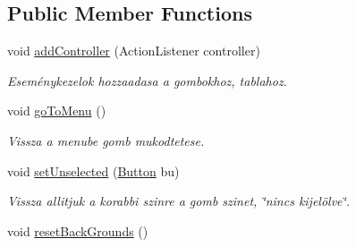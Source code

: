 \subsection*{Public Member Functions}
\begin{DoxyCompactItemize}
\item 
\hypertarget{classview_1_1_checkers_view_a32d5da333ffe78031b1717b10a583d01}{}void \hyperlink{classview_1_1_checkers_view_a32d5da333ffe78031b1717b10a583d01}{add\+Controller} (Action\+Listener controller)\label{classview_1_1_checkers_view_a32d5da333ffe78031b1717b10a583d01}

\begin{DoxyCompactList}\small\item\em Eseménykezelok hozzaadasa a gombokhoz, tablahoz. \end{DoxyCompactList}\item 
\hypertarget{classview_1_1_checkers_view_a5ed677cd4f78c6168bebbe4bf311bff5}{}void \hyperlink{classview_1_1_checkers_view_a5ed677cd4f78c6168bebbe4bf311bff5}{go\+To\+Menu} ()\label{classview_1_1_checkers_view_a5ed677cd4f78c6168bebbe4bf311bff5}

\begin{DoxyCompactList}\small\item\em Vissza a menube gomb mukodtetese. \end{DoxyCompactList}\item 
void \hyperlink{classview_1_1_checkers_view_a68fe3b1f0a965c499d06c2c0ac4364bf}{set\+Unselected} (\hyperlink{classview_1_1_button}{Button} bu)
\begin{DoxyCompactList}\small\item\em Vissza allitjuk a korabbi szinre a gomb szinet, \char`\"{}nincs kijelölve\char`\"{}. \end{DoxyCompactList}\item 
\hypertarget{classview_1_1_checkers_view_a8a5602a18f240d3262866c354995c4e5}{}void \hyperlink{classview_1_1_checkers_view_a8a5602a18f240d3262866c354995c4e5}{reset\+Back\+Grounds} ()\label{classview_1_1_checkers_view_a8a5602a18f240d3262866c354995c4e5}


\end{DoxyCompactItemize}
